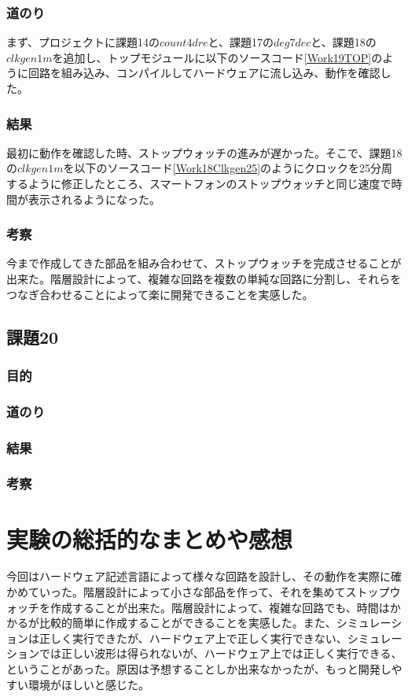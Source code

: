 \documentclass[a4paper]{jarticle}
\begin{document}
\subsubsection{道のり}
まず、プロジェクトに課題14の$count4dre$と、課題17の$deg7dec$と、課題18の$clkgen1m$を追加し、トップモジュールに以下のソースコード\ref{Work19TOP}のように回路を組み込み、コンパイルしてハードウェアに流し込み、動作を確認した。

\subsubsection{結果}
最初に動作を確認した時、ストップウォッチの進みが遅かった。そこで、課題18の$clkgen1m$を以下のソースコード\ref{Work18Clkgen25}のようにクロックを25分周するように修正したところ、スマートフォンのストップウォッチと同じ速度で時間が表示されるようになった。

\subsubsection{考察}
今まで作成してきた部品を組み合わせて、ストップウォッチを完成させることが出来た。階層設計によって、複雑な回路を複数の単純な回路に分割し、それらをつなぎ合わせることによって楽に開発できることを実感した。
\subsection{課題20}
\subsubsection{目的}
\subsubsection{道のり}
\subsubsection{結果}
\subsubsection{考察}
\section{実験の総括的なまとめや感想}
今回はハードウェア記述言語によって様々な回路を設計し、その動作を実際に確かめていった。階層設計によって小さな部品を作って、それを集めてストップウォッチを作成することが出来た。階層設計によって、複雑な回路でも、時間はかかるが比較的簡単に作成することができることを実感した。また、シミュレーションは正しく実行できたが、ハードウェア上で正しく実行できない、シミュレーションでは正しい波形は得られないが、ハードウェア上では正しく実行できる、ということがあった。原因は予想することしか出来なかったが、もっと開発しやすい環境がほしいと感じた。
\end{document}
